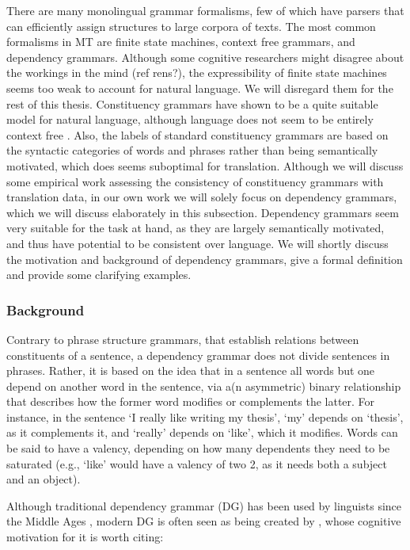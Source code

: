 \documentclass{report}
\theoremstyle{definition}
\theoremstyle{plain}
\begin{document}
There are many monolingual grammar formalisms, few of which have parsers that can efficiently assign structures to large corpora of texts. The most common formalisms in MT are finite state machines, context free grammars, and dependency grammars. Although some cognitive researchers might disagree about the workings in the mind (ref rens?), the expressibility of finite state machines seems too weak to account for natural language. We will disregard them for the rest of this thesis. Constituency grammars have shown to be a quite suitable model for natural language, although language does not seem to be entirely context free \citep{shieber1987evidence}. Also, the labels of standard constituency grammars are based on the syntactic categories of words and phrases rather than being semantically motivated, which does seems suboptimal for translation. Although we will discuss some empirical work assessing the consistency of constituency grammars with translation data, in our own work we will solely focus on dependency grammars, which we will discuss elaborately in this subsection. Dependency grammars seem very suitable for the task at hand, as they are largely semantically motivated, and thus have potential to be consistent over language. We will shortly discuss the motivation and background of dependency grammars, give a formal definition and provide some clarifying examples.

\subsubsection{Background}

Contrary to phrase structure grammars, that establish relations between constituents of a sentence, a dependency grammar does not divide sentences in phrases. Rather, it is based on the idea that in a sentence all words but one depend on another word in the sentence, via a(n asymmetric) binary relationship that describes how the former word modifies or complements the latter. For instance, in the sentence `I really like writing my thesis', `my' depends on `thesis', as it complements it, and `really' depends on `like', which it modifies. Words can be said to have a valency, depending on how many dependents they need to be saturated (e.g., `like' would have a valency of two 2, as it needs both a subject and an object).

Although traditional dependency grammar (DG) has been used by linguists since the Middle Ages \citep{covington1990dependency}, modern DG is often seen as being created by \cite{tesniere1959elements}, whose cognitive motivation for it is worth citing:
\end{document}
